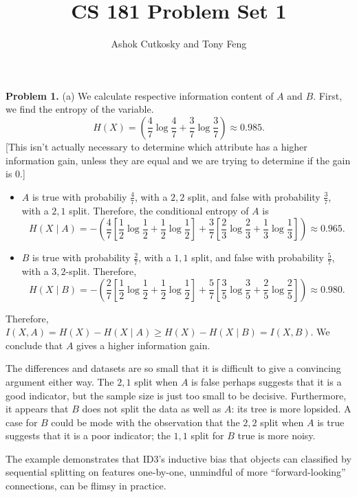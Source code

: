\documentclass[12pt]{amsart}
\title{CS 181 Problem Set 1}
\author{Ashok Cutkosky and Tony Feng}
\theoremstyle{remark}
\begin{document}
\maketitle

\noindent \textbf{Problem 1.} (a) We calculate respective information content of $A$ and $B$. First, we find the entropy of the variable. 
\[
H(X) = \left( \frac{4}{7} \log \frac{4}{7} + \frac{3}{7} \log \frac{3}{7} \right) \approx 0.985. 
\]
[This isn't actually necessary to determine which attribute has a higher information gain, unless they are equal and we are trying to determine if the gain is $0$.] 
\begin{itemize}
\item $A$ is true with probabiliy $\frac{4}{7}$, with a $2,2$ split, and false with probability $\frac{3}{7}$, with a $2,1$ split. Therefore, the conditional entropy of $A$ is 
\[
H(X \mid A) = - \left( \frac{4}{7} \left[ \frac{1}{2} \log \frac{1}{2} + \frac{1}{2} \log \frac{1}{2} \right] + 
\frac{3}{7} \left[ \frac{2}{3} \log \frac{2}{3} + \frac{1}{3} \log \frac{1}{3} \right] \right) \approx 0.965. 
\]
\item $B$ is true with probability $\frac{2}{7}$, with a $1,1$ split, and false with probability $\frac{5}{7}$, with a $3,2$-split. Therefore, 
\[
H(X \mid B) = - \left( \frac{2}{7} \left[ \frac{1}{2} \log \frac{1}{2} + \frac{1}{2} \log \frac{1}{2} \right]  + \frac{5}{7} \left[ \frac{3}{5} \log \frac{3}{5} + \frac{2}{5} \log \frac{2}{5} \right] \right) \approx 0.980.
\]
\end{itemize} 
Therefore, $I(X,A) = H(X) - H(X \mid A) \geq H(X) - H(X \mid B) = I(X,B)$. We conclude that $A$ gives a higher information gain. 

The differences and datasets are so small that it is difficult to give a convincing argument either way. The 
$2,1$ split when $A$ is false perhaps suggests that it is a good indicator, but the sample size is just too 
small to be decisive. Furthermore, it appears that $B$ does not split the data as well as $A$: its tree is more 
lopsided. A case for $B$ could be mode with the observation that the $2,2$ split when $A$ is true suggests 
that it is a poor indicator; the $1,1$ split for $B$ true is more noisy. 

The example demonstrates that ID3's inductive bias that objects can classified by sequential splitting on features one-by-one, unmindful of more ``forward-looking'' connections, can be flimsy in practice. \\
\end{document}
